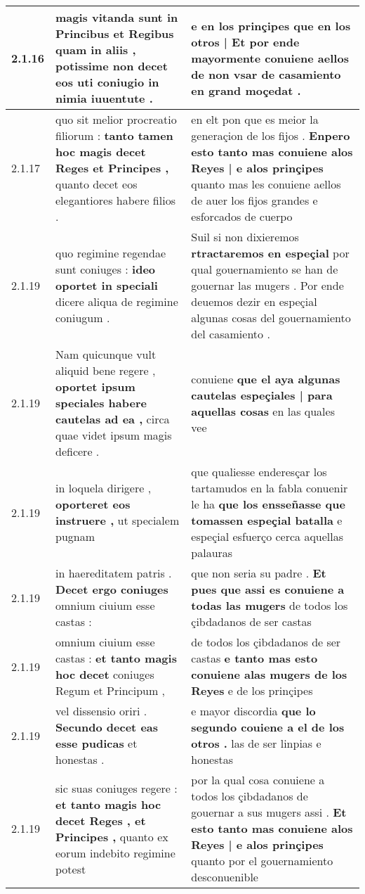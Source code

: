 \begin{tabular}{|p{1cm}|p{6.5cm}|p{6.5cm}|}
2.1.16 & magis vitanda sunt in Princibus et Regibus quam in aliis , \textbf{ potissime non decet } eos uti coniugio in nimia iuuentute . & e en los prinçipes \textbf{ que en los otros | Et por ende mayormente conuiene aellos } de non vsar de casamiento en grand moçedat . \\\hline
2.1.17 & quo sit melior procreatio filiorum : \textbf{ tanto tamen hoc magis decet Reges et Principes , } quanto decet eos elegantiores habere filios . & en elt pon que es meior la generaçion de los fijos . \textbf{ Enpero esto tanto mas conuiene alos Reyes | e alos prinçipes } quanto mas les conuiene aellos de auer los fijos grandes e esforcados de cuerpo \\\hline
2.1.19 & quo regimine regendae sunt coniuges : \textbf{ ideo oportet in speciali } dicere aliqua de regimine coniugum . & Suil si non dixieremos \textbf{ rtractaremos en espeçial } por qual gouernamiento se han de gouernar las mugers . Por ende deuemos dezir en espeçial algunas cosas del gouernamiento del casamiento . \\\hline
2.1.19 & Nam quicunque vult aliquid bene regere , \textbf{ oportet ipsum speciales habere cautelas ad ea , } circa quae videt ipsum magis deficere . & conuiene \textbf{ que el aya algunas cautelas espeçiales | para aquellas cosas } en las quales vee \\\hline
2.1.19 & in loquela dirigere , \textbf{ oporteret eos instruere , } ut specialem pugnam & que qualiesse enderesçar los tartamudos en la fabla conuenir le ha \textbf{ que los ensseñasse que tomassen espeçial batalla } e espeçial esfuerço cerca aquellas palauras \\\hline
2.1.19 & in haereditatem patris . \textbf{ Decet ergo coniuges } omnium ciuium esse castas : & que non seria su padre . \textbf{ Et pues que assi es conuiene a todas las mugers } de todos los çibdadanos de ser castas \\\hline
2.1.19 & omnium ciuium esse castas : \textbf{ et tanto magis hoc decet } coniuges Regum et Principum , & de todos los çibdadanos de ser castas \textbf{ e tanto mas esto conuiene alas mugers de los Reyes } e de los prinçipes \\\hline
2.1.19 & vel dissensio oriri . \textbf{ Secundo decet eas esse pudicas } et honestas . & e mayor discordia \textbf{ que lo segundo couiene a el de los otros . } las de ser linpias e honestas \\\hline
2.1.19 & sic suas coniuges regere : \textbf{ et tanto magis hoc decet Reges , et Principes , } quanto ex eorum indebito regimine potest & por la qual cosa conuiene a todos los çibdadanos de gouernar a sus mugers assi . \textbf{ Et esto tanto mas conuiene alos Reyes | e alos prinçipes } quanto por el gouernamiento desconuenible \\\hline

\end{tabular}
